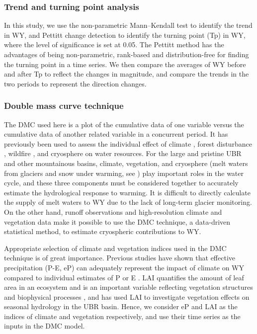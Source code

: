 \documentclass[hess, manuscript]{copernicus}
\begin{document}
\subsubsection{Trend and turning point analysis}
In this study, we use the non-parametric Mann--Kendall test \citep{kendall1938new,mann1945nonparametric} to identify the trend in WY, and Pettitt change detection \citep{pettitt1979non} to identify the turning point (Tp) in WY, where the level of significance is set at 0.05. The Pettitt method has the advantages of being non-parametric, rank-based and distribution-free for finding the turning point in a time series. We then compare the averages of WY before and after Tp to reflect the changes in magnitude, and compare the trends in the two periods to represent the direction changes.

\subsubsection{Double mass curve technique}
The DMC used here is a plot of the cumulative data of one variable versus the cumulative data of another related variable in a concurrent period. It has previously been used to assess the individual effect of climate \citep{gao2011changes}, forest disturbance \citep{wei2010quantifying}, wildfire \citep{hallema2018burned}, and cryosphere \citep{brahney2017determining} on water resources. For the large and pristine UBR and other mountainous basins, climate, vegetation, and cryosphere (melt waters from glaciers and snow under warming, see \citealt{biemans2019importance,huss2018global}) play important roles in the water cycle, and these three components must be considered together to accurately estimate the hydrological response to warming. It is difficult to directly calculate the supply of melt waters to WY due to the lack of long-term glacier monitoring. On the other hand, runoff observations and high-resolution climate and vegetation data make it possible to use the DMC technique, a data-driven statistical method, to estimate cryospheric contributions to WY.  

Appropriate selection of climate and vegetation indices used in the DMC technique is of great importance. Previous studies have shown that effective precipitation (P-E, eP) can adequately represent the impact of climate on WY compared to individual estimates of P or E \citep{wei2010quantifying,zhang2019separating}. LAI quantifies the amount of leaf area in an ecosystem and is an important variable reflecting vegetation structures and biophysical processes \citep{forzieri2020increased}, and \citet{li2021vegetation} has used LAI to investigate vegetation effects on seasonal hydrology in the UBR basin. Hence, we consider eP and LAI as the indices of climate and vegetation respectively, and use their time series as the inputs in the DMC model. 
\end{document}
